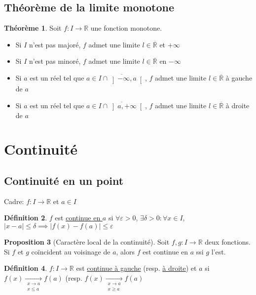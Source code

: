 \documentclass[10pt,a4paper]{article}
\theoremstyle{definition}
\newtheorem{proposition}{Proposition}[section]
\newtheorem{theorem}[proposition]{Théorème}
\newtheorem{definition}[proposition]{Définition}
\begin{document}
\subsection{Théorème de la limite monotone}
\begin{theorem}
Soit $f: I \to \mathbb{R}$ une fonction monotone.
\begin{itemize}
\item Si $I$ n'est pas majoré, $f$ admet une limite $l \in \overline{\mathbb{R}}$ et $+\infty$
\item Si $I$ n'est pas minoré, $f$ admet une limite $l \in \overline{\mathbb{R}}$ en $-\infty$
\item Si $a$ est un réel tel que $a \in \overline{I \cap \left]-\infty, a\right[}$, $f$ admet une limite $l \in \overline{\mathbb{R}}$ à gauche de $a$
\item Si $a$ est un réel tel que $a \in \overline{I \cap \left]a, +\infty\right[}$, $f$ admet une limite $l \in \overline{\mathbb{R}}$ à droite de $a$
\end{itemize}
\end{theorem}

\section{Continuité}
\subsection{Continuité en un point}
Cadre: $f: I \to \mathbb{R}$ et $a \in I$
\begin{definition}
$f$ est \uline{continue en $a$} si $\forall \varepsilon > 0$, $\exists \delta > 0: \forall x \in I$, $|x - a| \leq \delta \implies |f(x) - f(a)| \leq \varepsilon$
\end{definition}
\begin{proposition}[Caractère local de la continuité]
Soit $f, g: I \to \mathbb{R}$ deux fonctions. \\
Si $f$ et $g$ coïncident au voisinage de $a$, alors $f$ est continue en $a$ ssi $g$ l'est.
\end{proposition}
\begin{definition}
$f: I \to \mathbb{R}$ est \uline{continue à gauche} (resp. \uline{à droite}) et $a$ si $f(x) \xrightarrow[\substack{x \to a \\ x \leq a}]{} f(a)$ (resp. $f(x) \xrightarrow[\substack{x \to a \\ x \geq a}]{} f(a)$
\end{definition}
\end{document}
